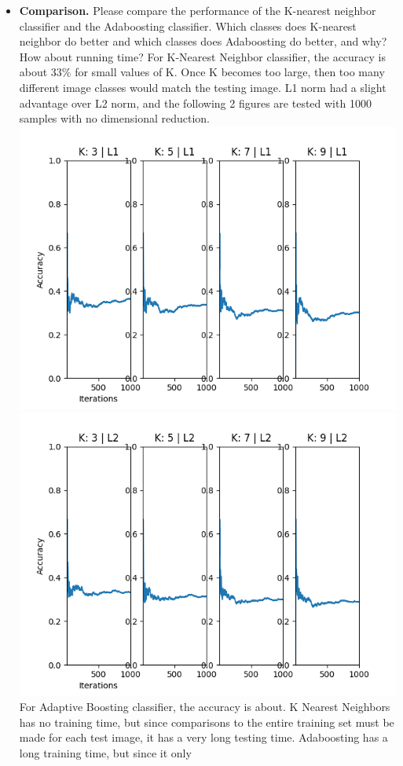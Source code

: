 \documentclass[11pt]{article}
\begin{document}
    \begin{itemize}
        \item \textbf{Comparison.} Please compare the performance of the K-nearest neighbor classifier and the
        Adaboosting classifier. Which classes does K-nearest neighbor do better and which classes does Adaboosting do better, and
        why? How about running time?
        For K-Nearest Neighbor classifier, the accuracy is about 33\% for small values of K. Once K becomes too
        large, then too many different image classes would match the testing image. L1 norm had a slight advantage
        over L2 norm, and the following 2 figures are tested with 1000 samples with no dimensional reduction.\newline
        \includegraphics[width=\textwidth]{Output Pictures/Nearest Neighbors L1}
        \includegraphics[width=\textwidth]{Output Pictures/Nearest Neighbors L2}
        For Adaptive Boosting classifier, the accuracy is about.
        K Nearest Neighbors has no training time, but since comparisons to the entire training set must be made for
        each test image, it has a very long testing time. Adaboosting has a long training time, but since it only


\end{itemize}
\end{document}
